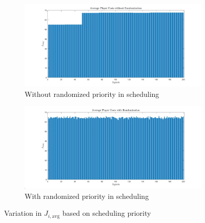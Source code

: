 \documentclass[11pt, letterpaper]{article}
\begin{document}
\begin{figure}[htbp]
\centering
\begin{subfigure}[c]{0.49\linewidth}
    \centering
    \includegraphics[width=\linewidth, trim=150 0 150 0, clip]{images/results_central_scheduler_avg_player_no_random.jpg}
    \caption{Without randomized priority in scheduling}
    \label{fig:results_central_scheduler_avg_player_no_random}
\end{subfigure}
\hfill
\begin{subfigure}[c]{0.49\linewidth}
    \centering
    \includegraphics[width=\linewidth, trim=150 0 150 0, clip]{images/results_central_scheduler_avg_player_random.jpg}
    \caption{With randomized priority in scheduling}
    \label{fig:results_central_scheduler_avg_player_random}
\end{subfigure}
\caption{Variation in $J_{i, \text{avg}}$ based on scheduling priority}
\label{fig:results_central_scheduler_avg_player}
\end{figure}
\end{document}
